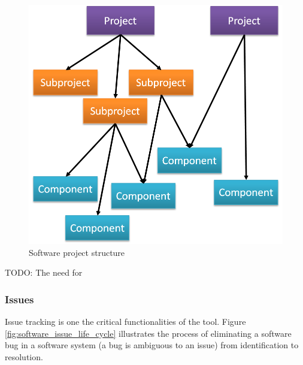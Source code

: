 \documentclass[10pt,a4paper]{article}
\begin{document}
\begin{figure}[h]
\centering
\includegraphics[scale=0.6]{fig/project_structure.png} 
\caption{Software project structure}
\label{fig:project_structure}
\end{figure}

TODO: The need for 


\subsubsection{Issues}
Issue tracking is one the critical functionalities of the tool. Figure \ref{fig:software_issue_life_cycle} illustrates the process of eliminating a software bug in a software system (a bug is ambiguous to an issue) from identification to resolution.
\end{document}
